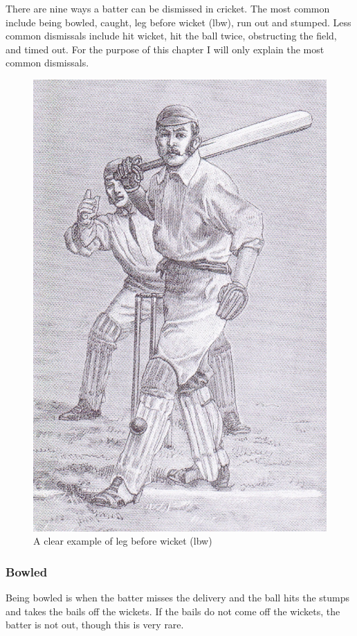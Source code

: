 \documentclass[12pt,a4paper]{report}
\theoremstyle{definition}
\begin{document}
There are nine ways a batter can be dismissed in cricket. 
The most common include being bowled, caught, leg before wicket (lbw), run out and stumped. 
Less common dismissals include hit wicket, hit the ball twice, obstructing the field, and timed out. 
For the purpose of this chapter I will only explain the most common dismissals. 

\begin{figure}[H]
    \centering
    \includegraphics[width=0.8\linewidth]{Leg_before_wicket.jpg}
    \caption{A clear example of leg before wicket (lbw) \citep{lbwWiki}}
    \label{fig:lbw}
\end{figure}

\subsubsection{Bowled}

Being bowled is when the batter misses the delivery and the ball hits the stumps and takes the bails off the wickets.
If the bails do not come off the wickets, the batter is not out, though this is very rare.
\end{document}
